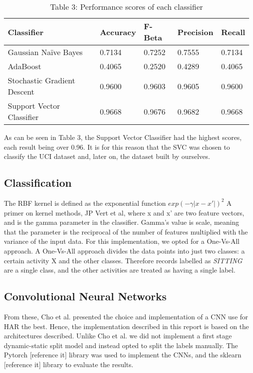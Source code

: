    \begin{table}[ht]
        \centering\footnotesize
        \begin{tabular}{|l|l|l|l|l|}
            \hline
            \textbf{Classifier} & \textbf{Accuracy} & \textbf{F-Beta}  & \textbf{Precision} & \textbf{Recall} \\ \hline
            Gaussian Naïve Bayes             & 0.7134           & 0.7252  & 0.7555 & 0.7134 \\ \hline
            AdaBoost            & 0.4065           & 0.2520 & 0.4289 & 0.4065 \\ \hline
            Stochastic Gradient Descent               & 0.9600           & 0.9603 & 0.9605 & 0.9600 \\ \hline
            Support Vector Classifier            & 0.9668           & 0.9676 & 0.9682 & 0.9668 \\ \hline
        \end{tabular}
        \caption*{Table 3: Performance scores of each classifier}
    \end{table}

    As can be seen in Table 3, the Support Vector Classifier had the highest scores, each result being over 0.96. It is for this reason that the SVC
    was chosen to classify the UCI dataset \cite{Anguita2013} and, later on, the dataset built by ourselves.

\subsection{Classification}
    The RBF kernel is defined as the exponential function \(exp(-\gamma \lvert x-x' \rvert)^2\) A primer on kernel methods, JP Vert et al, where x and x’ are two feature vectors, and is the
    gamma parameter in the classifier. Gamma’s value is scale, meaning that the parameter is the reciprocal of the number of features multiplied with the variance of the input data.
    For this implementation, we opted for a One-Vs-All approach. A One-Vs-All approach divides the data points into just two classes: a certain activity X and the other classes. Therefore records
    labelled as \emph{SITTING} are a single class, and the other activities are treated as having a single label.

\subsection{Convolutional Neural Networks}
From these, Cho et al. \cite{Cho2018} presented the choice and implementation of a CNN use for HAR the best.
Hence, the implementation described in this report is based on the architectures described.
Unlike Cho et al. we did not implement a first stage dynamic-static split model and instead opted to split the labels manually.
The Pytorch [reference it] library was used to implement the CNNs, and the sklearn [reference it] library to evaluate the results.

